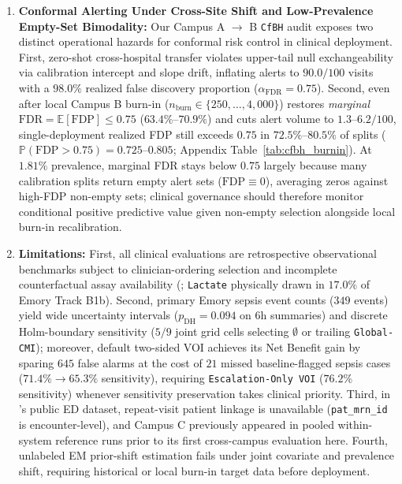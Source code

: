 \documentclass[11pt]{article}
\begin{document}
\begin{enumerate}
  \item \textbf{Conformal Alerting Under Cross-Site Shift and Low-Prevalence Empty-Set Bimodality:} Our Campus A $\to$ B \texttt{CfBH} audit exposes two distinct operational hazards for conformal risk control in clinical deployment. First, zero-shot cross-hospital transfer violates upper-tail null exchangeability via calibration intercept and slope drift, inflating alerts to $90.0/100$ visits with a $98.0\%$ realized false discovery proportion ($\alpha_{\text{FDR}}=0.75$). Second, even after local Campus B burn-in ($n_{\text{burn}} \in \{250,\dots,4{,}000\}$) restores \emph{marginal} $\text{FDR} = \mathbb{E}[\text{FDP}] \le 0.75$ ($63.4\%\text{--}70.9\%$) and cuts alert volume to $1.3\text{--}6.2/100$, single-deployment realized FDP still exceeds $0.75$ in $\mathbf{72.5\%\text{--}80.5\%}$ of splits ($\mathbb{P}(\text{FDP} > 0.75) = 0.725\text{--}0.805$; Appendix Table~\ref{tab:cfbh_burnin}). At $1.81\%$ prevalence, marginal FDR stays below $0.75$ largely because many calibration splits return empty alert sets ($\text{FDP} \equiv 0$), averaging zeros against high-FDP non-empty sets; clinical governance should therefore monitor conditional positive predictive value given non-empty selection alongside local burn-in recalibration.
  \item \textbf{Limitations:} First, all clinical evaluations are retrospective observational benchmarks subject to clinician-ordering selection and incomplete counterfactual assay availability (\citealp{agniel2018biases,vonkleist2025evaluation}; \texttt{Lactate} physically drawn in $17.0\%$ of Emory Track B1b). Second, primary Emory sepsis event counts ($349$ events) yield wide uncertainty intervals ($p_{\text{DH}}=0.094$ on $6\text{h}$ summaries) and discrete Holm-boundary sensitivity ($5/9$ joint grid cells selecting $\emptyset$ or trailing \texttt{Global-CMI}); moreover, default two-sided VOI achieves its Net Benefit gain by sparing $645$ false alarms at the cost of $21$ missed baseline-flagged sepsis cases ($71.4\% \to 65.3\%$ sensitivity), requiring \texttt{Escalation-Only VOI} ($76.2\%$ sensitivity) whenever sensitivity preservation takes clinical priority. Third, in \citet{hong2018predicting}'s public ED dataset, repeat-visit patient linkage is unavailable (\texttt{pat\_mrn\_id} is encounter-level), and Campus C previously appeared in pooled within-system reference runs prior to its first cross-campus evaluation here. Fourth, unlabeled EM prior-shift estimation fails under joint covariate and prevalence shift, requiring historical or local burn-in target data before deployment.
\end{enumerate}
\end{document}
